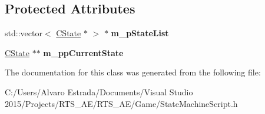 \subsection*{Protected Attributes}
\begin{DoxyCompactItemize}
\item 
std\+::vector$<$ \hyperlink{class_c_state}{C\+State} $\ast$ $>$ $\ast$ {\bfseries m\+\_\+p\+State\+List}\hypertarget{classae_state_machine_script_aa245cd1a4f354684601861546ce8fdc2}{}\label{classae_state_machine_script_aa245cd1a4f354684601861546ce8fdc2}

\item 
\hyperlink{class_c_state}{C\+State} $\ast$$\ast$ {\bfseries m\+\_\+pp\+Current\+State}\hypertarget{classae_state_machine_script_a94da15ddbb9f68be06d4ece7027a6b60}{}\label{classae_state_machine_script_a94da15ddbb9f68be06d4ece7027a6b60}

\end{DoxyCompactItemize}


The documentation for this class was generated from the following file\+:\begin{DoxyCompactItemize}
\item 
C\+:/\+Users/\+Alvaro Estrada/\+Documents/\+Visual Studio 2015/\+Projects/\+R\+T\+S\+\_\+\+A\+E/\+R\+T\+S\+\_\+\+A\+E/\+Game/State\+Machine\+Script.\+h\end{DoxyCompactItemize}
